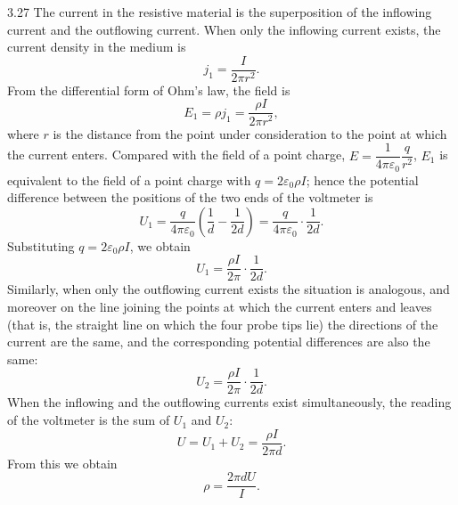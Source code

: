 \begin{solution}{3.27}
The current in the resistive material is the superposition of the inflowing current and the outflowing current. When only the inflowing current exists, the current density in the medium is
\[
j_1=\frac{I}{2\pi r^2}.
\]
From the differential form of Ohm's law, the field is
\[
E_1=\rho j_1=\frac{\rho I}{2\pi r^2},
\]
where $r$ is the distance from the point under consideration to the point at which the current enters. Compared with the field of a point charge, $E=\dfrac{1}{4\pi\varepsilon_0}\dfrac{q}{r^2}$, $E_1$ is equivalent to the field of a point charge with $q=2\varepsilon_0\rho I$; hence the potential difference between the positions of the two ends of the voltmeter is
\[
U_1=\frac{q}{4\pi\varepsilon_0}\left(\frac{1}{d}-\frac{1}{2d}\right)
=\frac{q}{4\pi\varepsilon_0}\cdot\frac{1}{2d}.
\]
Substituting $q=2\varepsilon_0\rho I$, we obtain
\[
U_1=\frac{\rho I}{2\pi}\cdot\frac{1}{2d}.
\]
Similarly, when only the outflowing current exists the situation is analogous, and moreover on the line joining the points at which the current enters and leaves (that is, the straight line on which the four probe tips lie) the directions of the current are the same, and the corresponding potential differences are also the same:
\[
U_2=\frac{\rho I}{2\pi}\cdot\frac{1}{2d}.
\]
When the inflowing and the outflowing currents exist simultaneously, the reading of the voltmeter is the sum of $U_1$ and $U_2$:
\[
U=U_1+U_2=\frac{\rho I}{2\pi d}.
\]
From this we obtain
\[
\rho=\frac{2\pi dU}{I}.
\]
\end{solution}

